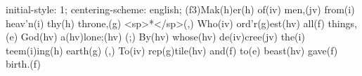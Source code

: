 initial-style: 1;
centering-scheme: english;
(f3)Mak(h)er(h) of(iv) men,(jv) from(i) heav'n(i) thy(h) throne,(g) <sp>*</sp>(,)
Who(iv) ord'r(g)est(hv) all(f) things,(e) God(hv) a(hv)lone;(hv) (;)
By(hv) whose(hv) de(iv)cree(jv) the(i) teem(i)ing(h) earth(g) (,)
To(iv) rep(g)tile(hv) and(f) to(e) beast(hv) gave(f) birth.(f)
